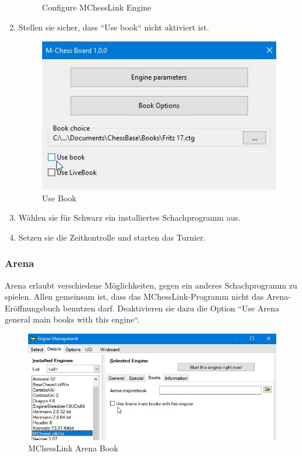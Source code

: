 \documentclass[11pt,a4paper]{article}
\begin{document}
\begin{enumerate}
\begin{figure}[H]
		\caption{Configure MChessLink Engine}
		\label{fig:FritzConfigureCertabo}
	\end{figure}

	\item Stellen sie sicher, dass ``Use book`` nicht aktiviert ist.
		\begin{figure}[H]
		\centering
		\includegraphics[scale=0.8]{fritz_engineusebook.jpg}
		\caption{Use Book}
		\label{fig:FritzUseBook}
	\end{figure}
	\item Wählen sie für Schwarz ein installiertes Schachprogramm aus.
	\item Setzen sie die Zeitkontrolle und starten das Turnier.	
\end{enumerate}

\subsubsection{Arena}
Arena erlaubt verschiedene Möglichkeiten, gegen ein anderes Schachprogramm zu spielen. Allen gemeinsam ist, dass das MChessLink-Programm nicht das Arena-Eröffnungsbuch benutzen darf. Deaktivieren sie dazu die Option ``Use Arena general main books with this engine``.
\begin{figure}[H]
	\centering
	\includegraphics[scale=0.7]{arena_mainbooks.jpg}
	\caption{MChessLink Arena Book}
	\label{fig:ArenaUseBook}
\end{figure}
\end{document}
